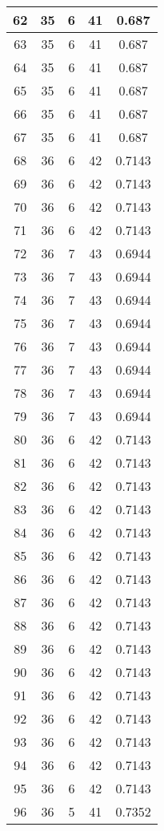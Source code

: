 \documentclass[letterpaper, 12pt]{article}
\begin{document}
\begin{longtable}{|c|c|c|c|c|}
\hline
62 & 35 & 6 & 41 & 0.687 \\
\hline
63 & 35 & 6 & 41 & 0.687 \\
\hline
64 & 35 & 6 & 41 & 0.687 \\
\hline
65 & 35 & 6 & 41 & 0.687 \\
\hline
66 & 35 & 6 & 41 & 0.687 \\
\hline
67 & 35 & 6 & 41 & 0.687 \\
\hline
68 & 36 & 6 & 42 & 0.7143 \\
\hline
69 & 36 & 6 & 42 & 0.7143 \\
\hline
70 & 36 & 6 & 42 & 0.7143 \\
\hline
71 & 36 & 6 & 42 & 0.7143 \\
\hline
72 & 36 & 7 & 43 & 0.6944 \\
\hline
73 & 36 & 7 & 43 & 0.6944 \\
\hline
74 & 36 & 7 & 43 & 0.6944 \\
\hline
75 & 36 & 7 & 43 & 0.6944 \\
\hline
76 & 36 & 7 & 43 & 0.6944 \\
\hline
77 & 36 & 7 & 43 & 0.6944 \\
\hline
78 & 36 & 7 & 43 & 0.6944 \\
\hline
79 & 36 & 7 & 43 & 0.6944 \\
\hline
80 & 36 & 6 & 42 & 0.7143 \\
\hline
81 & 36 & 6 & 42 & 0.7143 \\
\hline
82 & 36 & 6 & 42 & 0.7143 \\
\hline
83 & 36 & 6 & 42 & 0.7143 \\
\hline
84 & 36 & 6 & 42 & 0.7143 \\
\hline
85 & 36 & 6 & 42 & 0.7143 \\
\hline
86 & 36 & 6 & 42 & 0.7143 \\
\hline
87 & 36 & 6 & 42 & 0.7143 \\
\hline
88 & 36 & 6 & 42 & 0.7143 \\
\hline
89 & 36 & 6 & 42 & 0.7143 \\
\hline
90 & 36 & 6 & 42 & 0.7143 \\
\hline
91 & 36 & 6 & 42 & 0.7143 \\
\hline
92 & 36 & 6 & 42 & 0.7143 \\
\hline
93 & 36 & 6 & 42 & 0.7143 \\
\hline
94 & 36 & 6 & 42 & 0.7143 \\
\hline
95 & 36 & 6 & 42 & 0.7143 \\
\hline
96 & 36 & 5 & 41 & 0.7352 \\

\end{longtable}
\end{document}
